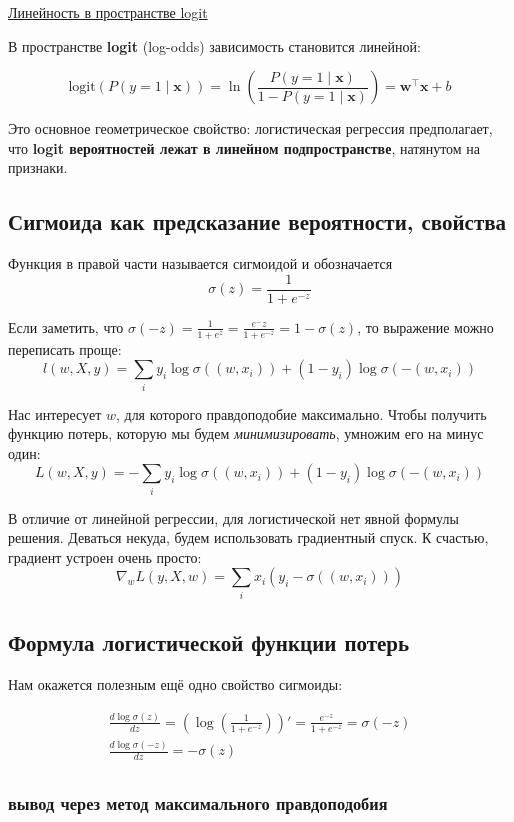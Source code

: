 \underline{Линейность в пространстве logit}

В пространстве \textbf{logit} (log-odds) зависимость становится линейной:

\[ \text{logit}(P(y=1 \mid \bm{x})) = \ln\left(\frac{P(y=1 \mid \bm{x})}{1 - P(y=1 \mid \bm{x})}\right) =
\bm{w}^\top \bm{x} + b \]

Это основное геометрическое свойство: логистическая регрессия предполагает, что \textbf{logit вероятностей лежат в
линейном подпространстве}, натянутом на признаки.

\subsection{Сигмоида как предсказание вероятности, свойства}

Функция в правой части называется сигмоидой и обозначается
\[ \sigma (z) = \frac{1}{1 + e^{-z}} \]

Если заметить, что $\sigma (-z) = \frac{1}{1 + e^z} = \frac{e^-z}{1 + e^{-z}} = 1 - \sigma(z)$, то выражение
можно переписать проще:
\[ l(w, X, y) = \sum_i y_i \log \sigma((w, x_i)) + (1 - y_i) \log \sigma(-(w, x_i)) \]

Нас интересует $w$, для которого правдоподобие максимально.
Чтобы получить функцию потерь, которую мы будем \textit{минимизировать}, умножим его на минус один:
\[ L(w, X, y) = - \sum_i y_i \log \sigma((w, x_i)) + (1 - y_i) \log \sigma(-(w, x_i)) \]

В отличие от линейной регрессии, для логистической нет явной формулы решения.
Деваться некуда, будем использовать градиентный спуск.
К счастью, градиент устроен очень просто:
\[ \nabla_w L(y, X, w) =\sum_i x_i (y_i - \sigma((w, x_i))) \]

\subsection{Формула логистической функции потерь}

Нам окажется полезным ещё одно свойство сигмоиды:

\begin{gather*}
    \frac{d \log \sigma(z)}{dz} = \left( \log \left( \frac{1}{1 + e^{-z}} \right) \right)' =
    \frac{e^{-z}}{1 + e^{-z}} = \sigma(-z) \\
    \frac{d \log \sigma(-z)}{dz} = -\sigma(z) \\
\end{gather*}

\subsubsection{вывод через метод максимального правдоподобия}

